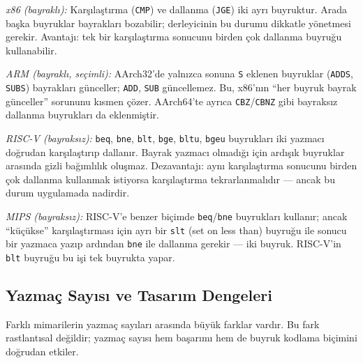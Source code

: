 \begin{karsilastirma}
\emph{x86 (bayraklı):} Karşılaştırma (\texttt{CMP}) ve dallanma (\texttt{JGE}) iki ayrı buyruktur. Arada başka buyruklar bayrakları bozabilir; derleyicinin bu durumu dikkatle yönetmesi gerekir. Avantajı: tek bir karşılaştırma sonucunu birden çok dallanma buyruğu kullanabilir.

\emph{ARM (bayraklı, seçimli):} AArch32'de yalnızca sonuna \texttt{S} eklenen buyruklar (\texttt{ADDS}, \texttt{SUBS}) bayrakları günceller; \texttt{ADD}, \texttt{SUB} güncellemez. Bu, x86'nın ``her buyruk bayrak günceller'' sorununu kısmen çözer. AArch64'te ayrıca \texttt{CBZ}/\texttt{CBNZ} gibi bayraksız dallanma buyrukları da eklenmiştir.

\emph{RISC-V (bayraksız):} \texttt{beq}, \texttt{bne}, \texttt{blt}, \texttt{bge}, \texttt{bltu}, \texttt{bgeu} buyrukları iki yazmacı doğrudan karşılaştırıp dallanır. Bayrak yazmacı olmadığı için ardışık buyruklar arasında gizli bağımlılık oluşmaz. Dezavantajı: aynı karşılaştırma sonucunu birden çok dallanma kullanmak istiyorsa karşılaştırma tekrarlanmalıdır --- ancak bu durum uygulamada nadirdir.

\emph{MIPS (bayraksız):} RISC-V'e benzer biçimde \texttt{beq}/\texttt{bne} buyrukları kullanır; ancak ``küçükse'' karşılaştırması için ayrı bir \texttt{slt} (set on less than) buyruğu ile sonucu bir yazmaca yazıp ardından \texttt{bne} ile dallanma gerekir --- iki buyruk. RISC-V'in \texttt{blt} buyruğu bu işi tek buyrukta yapar.
\end{karsilastirma}

\subsection{Yazmaç Sayısı ve Tasarım Dengeleri}
\label{subsec:yazmac-sayisi-dengesi}

Farklı mimarilerin yazmaç sayıları arasında büyük farklar vardır. Bu fark rastlantısal değildir; yazmaç sayısı hem başarımı hem de buyruk kodlama biçimini doğrudan etkiler.

